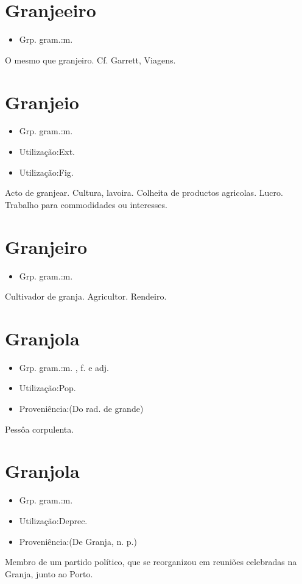 \section{Granjeeiro}
\begin{itemize}
\item {Grp. gram.:m.}
\end{itemize}
O mesmo que \textunderscore granjeiro\textunderscore . Cf. Garrett, \textunderscore Viagens\textunderscore .
\section{Granjeio}
\begin{itemize}
\item {Grp. gram.:m.}
\end{itemize}
\begin{itemize}
\item {Utilização:Ext.}
\end{itemize}
\begin{itemize}
\item {Utilização:Fig.}
\end{itemize}
Acto de granjear.
Cultura, lavoira.
Colheita de productos agricolas.
Lucro.
Trabalho para commodidades ou interesses.
\section{Granjeiro}
\begin{itemize}
\item {Grp. gram.:m.}
\end{itemize}
Cultivador de granja.
Agricultor.
Rendeiro.
\section{Granjola}
\begin{itemize}
\item {Grp. gram.:m. ,  f.  e  adj.}
\end{itemize}
\begin{itemize}
\item {Utilização:Pop.}
\end{itemize}
\begin{itemize}
\item {Proveniência:(Do rad. de \textunderscore grande\textunderscore )}
\end{itemize}
Pessôa corpulenta.
\section{Granjola}
\begin{itemize}
\item {Grp. gram.:m.}
\end{itemize}
\begin{itemize}
\item {Utilização:Deprec.}
\end{itemize}
\begin{itemize}
\item {Proveniência:(De \textunderscore Granja\textunderscore , n. p.)}
\end{itemize}
Membro de um partido político, que se reorganizou em reuniões celebradas na Granja, junto ao Porto.
